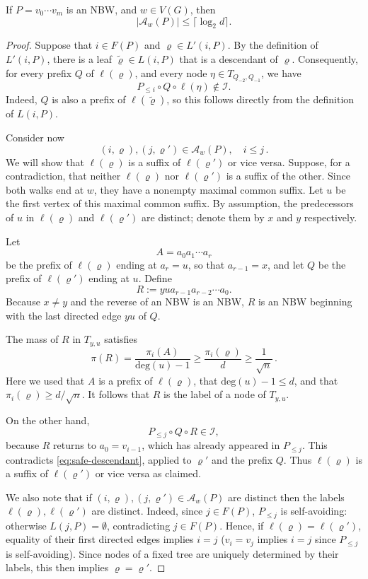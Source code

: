 \documentclass[10pt,a4paper]{amsart}
\def\deg{\mathrm{deg}}
\let\rho=\varrho
\begin{document}
\begin{lemma}\label{lem:endpoint-mult}
If $P=v_0\cdots v_m$ is an NBW, and $w\in V(G)$, then
\[
|\mathcal A_w(P)|
\le
\lceil\log_2 d\rceil.
\]
\end{lemma}

\begin{proof}
 Suppose that
$i\in F(P)$ and $\rho\in L'(i,P)$. By the definition of
$L'(i,P)$, there is a leaf $\tilde \rho\in L(i,P)$ that is a
descendant of $\rho$. Consequently, for every prefix $Q$ of
$\ell(\rho)$, and every node
$\eta\in T_{Q_{-2},Q_{-1}}$, we have
\[
P_{\le i}\circ Q\circ\ell(\eta)\notin\mathcal I.
\tag{1}\label{eq:safe-descendant}
\]
Indeed, $Q$ is also a prefix of $\ell(\tilde\rho)$, so this follows
directly from the definition of $L(i,P)$.

Consider now
\[
(i,\rho),(j,\rho')\in\mathcal A_w(P), \quad i\leq j\, .
\]
We will show that $\ell(\rho)$ is a suffix of $\ell(\rho')$ or vice versa. 
Suppose, for a contradiction, that neither $\ell(\rho)$ nor
$\ell(\rho')$ is a suffix of the other. Since both walks end at $w$,
they have a nonempty maximal common suffix. Let $u$ be the first
vertex of this maximal common suffix. By assumption, the predecessors of $u$ in
$\ell(\rho)$ and $\ell(\rho')$ are distinct; denote them by $x$ and
$y$ respectively.

Let
\[
A=a_0a_1\cdots a_r
\]
be the prefix of $\ell(\rho)$ ending at $a_r=u$, so that
$a_{r-1}=x$, and let $Q$ be the prefix of $\ell(\rho')$ ending at
$u$. Define
\[
R:=yua_{r-1}a_{r-2}\cdots a_0.
\]
Because $x\neq y$ and the reverse of an NBW is an NBW, $R$ is an
NBW beginning with the last directed edge $yu$ of $Q$.

The mass of $R$ in $T_{y,u}$ satisfies
\[
\pi(R)
=
\frac{\pi_i(A)}{\deg(u)-1}
\ge
\frac{\pi_i(\rho)}{d}
\ge
\frac{1}{\sqrt n}\, .
\]
Here we used that $A$ is a prefix of $\ell(\rho)$, that
$\deg(u)-1\le d$, and that
$\pi_i(\rho)\ge d/\sqrt n$. It follows that $R$ is the label of
a node of $T_{y,u}$.

On the other hand,
\[
P_{\le j}\circ Q\circ R\in\mathcal I,
\]
because $R$ returns to $a_0=v_{i-1}$, which has already appeared
in $P_{\le j}$. This contradicts
\eqref{eq:safe-descendant}, applied to $\rho'$ and the prefix
$Q$. Thus $\ell(\rho)$ is a suffix of $\ell(\rho')$ or vice versa as claimed. 

We also note that if 
\(
(i,\rho),(j,\rho')\in\mathcal A_w(P)
\)
are distinct then the labels $\ell(\rho), \ell(\rho')$ are
distinct.
Indeed, since $j\in F(P)$, $P_{\le j}$ is
self-avoiding: otherwise $L(j,P)=\emptyset$, contradicting
$j\in F(P)$. Hence, if
$\ell(\rho)=\ell(\rho')$, equality of their first directed edges
implies $i=j$ ($v_i=v_j$ implies $i=j$ since $P_{\leq j}$ is self-avoiding). Since nodes of a fixed tree are uniquely determined
by their labels, this then implies $\rho=\rho'$.


\end{proof}
\end{document}
